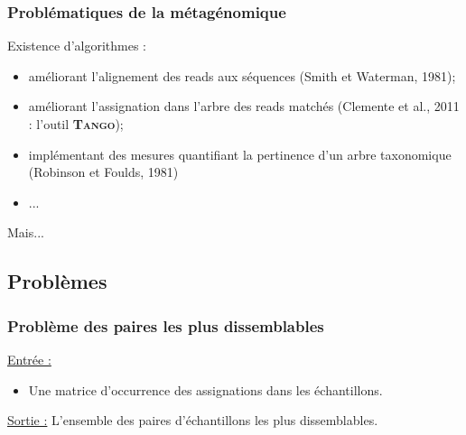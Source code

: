 \documentclass{beamer}
\begin{document}
\begin{frame}
\frametitle{Problématiques de la métagénomique}

Existence d'algorithmes :
\pause
\begin{itemize}
\item améliorant l'alignement des reads aux séquences (Smith et Waterman, 1981);
\pause
\item améliorant l'assignation dans l'arbre des reads matchés (Clemente et al., 2011 : l'outil\textsc{ \bf Tango});
\pause
\item implémentant des mesures quantifiant la pertinence d'un arbre taxonomique (Robinson et Foulds, 1981)
\item ...
\end{itemize}
\pause

\begin{center}
Mais...
\end{center}



\end{frame}

\subsection{Problèmes}

\begin{frame}
\tableofcontents[currentsubsection]
\end{frame}

\begin{frame}
\frametitle{Problème des paires les plus dissemblables}

\uline{Entrée :} \begin{itemize} \item Une matrice d'occurrence des assignations dans les échantillons. \end{itemize}

\bigskip
\uline{Sortie :} L'ensemble des paires d'échantillons les plus dissemblables.

\end{frame}
\end{document}

